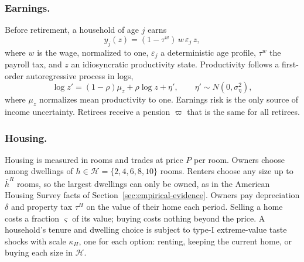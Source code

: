\subsubsection*{Earnings.}
Before retirement, a household of age $j$ earns
\begin{equation}
 y_j(z)=(1-\tau^w)\,w\,\varepsilon_j\,z ,
 \label{eq:m5-earnings}
\end{equation}
where $w$ is the wage, normalized to one, $\varepsilon_j$ a deterministic
age profile, $\tau^w$ the payroll tax, and $z$ an idiosyncratic productivity
state. Productivity follows a first-order autoregressive process in logs,
\begin{equation}
 \log z'=(1-\rho)\mu_z+\rho\log z+\eta',\qquad \eta'\sim N(0,\sigma_\eta^2),
 \label{eq:m5-ar1}
\end{equation}
where $\mu_z$ normalizes mean productivity to one. Earnings risk is the
only source of income uncertainty. Retirees receive a
pension $\varpi$ that is the same for all retirees.

\subsubsection*{Housing.}
Housing is measured in rooms and trades at price $P$ per room. Owners choose
among dwellings of $h\in\mathcal H=\{2,4,6,8,10\}$ rooms. Renters choose any
size up to $\bar h^R$ rooms, so the largest dwellings can only be owned, as in
the American Housing Survey facts of Section~\ref{sec:empirical-evidence}.
Owners pay depreciation $\delta$ and property tax $\tau^H$ on the value of
their home each period. Selling a home costs a fraction $\varsigma$ of its value;
buying costs nothing beyond the price.
A household's tenure and dwelling choice is subject to type-I extreme-value
taste shocks with scale $\kappa_H$, one for each option: renting, keeping the
current home, or buying each size in $\mathcal H$.

